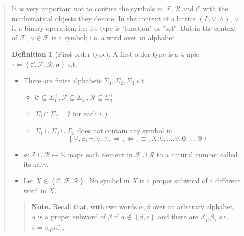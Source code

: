 \documentclass[a4paper, 12pt]{article}
\theoremstyle{definition}
\theoremstyle{definition}
\theoremstyle{definition}
\newtheorem{definition}{Definition}
\begin{document}
\begin{quote}
\begin{quote}
\end{quote}
\normalsize

It is very important not to confuse the symbols in $\mathcal{F},\mathcal{R} $
and $\mathcal{C}$ with the mathematical objects they denote. In the context of
a lattice $(L, \lor, \land)$, $\lor$ is a binary operation; i.e. its type is
"function" or "set". But in the context of $\mathcal{F}$, $\lor  \in
\mathcal{F}$ is a symbol; i.e. a word over an alphabet.

\begin{definition}[First order type]
    A first-order type is a $4$-uple $\tau = \left\{ \mathcal{C}, \mathcal{F}, \mathcal{R}, \mathcal{a} \right\} $ 
    s.t. 

    \begin{itemize}
        \item There are finite alphabets $\Sigma_1, \Sigma_2, \Sigma_3$ s.t. 
            \begin{itemize}
                \item $\mathcal{C} \subseteq \Sigma_1^{+}, \mathcal{F} \subseteq \Sigma_2^{+}, \mathcal{R} \subseteq \Sigma_3^+$
                \item $\Sigma_i \cap \Sigma_j = \emptyset$ for each $i, j$.
                \item $\Sigma_1 \cup \Sigma_2 \cup \Sigma_3$ does not contain 
                    any symbol in $$\left\{ \forall , \exists , \neg, \lor , \land , \Rightarrow, \iff, \equiv, X, 0,\ldots, 9, \textbf{0},\ldots, \textbf{9} \right\} $$
            \end{itemize}
        \item $\mathcal{a} : \mathcal{F} \cup \mathcal{R} \mapsto \mathbb{N}$ maps each element in $\mathcal{F} \cup \mathcal{R}$ to a natural number called its arity.
        \item Let $X \in \left\{ \mathcal{C}, \mathcal{F}, \mathcal{R} \right\} $. No symbol in $X$
            is a proper subword of a different word in $X$.
    \end{itemize}
\end{definition}


\small
\begin{quote}

\textbf{Note.} Recall that, with two words $\alpha, \beta$ over an arbitrary alphabet, 
$\alpha$ is a proper subword of $\beta$ if $\alpha \not\in \left\{ \beta, \epsilon \right\} $
and there are $\beta_0, \beta_1$ s.t. $\beta = \beta_0\alpha\beta_1$.

\end{quote}
\normalsize


\end{quote}
\end{document}
